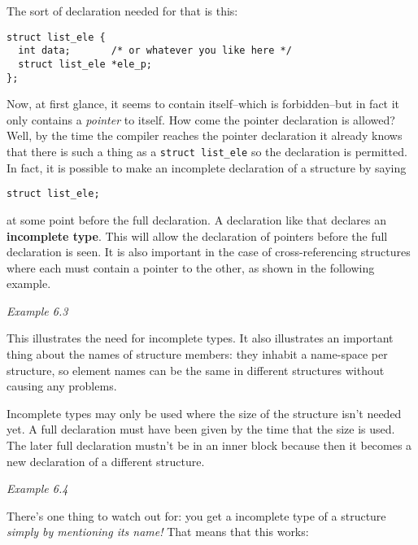    The sort of declaration needed for that is this:


   \begin{Verbatim}
struct list_ele {
  int data;       /* or whatever you like here */
  struct list_ele *ele_p;
};
\end{Verbatim}

   Now, at first glance, it seems to contain itself--which is
    forbidden--but in fact it only contains a \textit{pointer} to itself.
    How come the pointer declaration is allowed? Well, by the time the compiler
    reaches the pointer declaration it already knows that there is such a thing
    as a \texttt{struct list\_ele} so the declaration is permitted. In fact,
    it is possible to make an incomplete declaration of a structure by
    saying


   \begin{Verbatim}
struct list_ele;
\end{Verbatim}

   at some point before the full declaration. A declaration like that
    declares an \textbf{incomplete type}. This will allow the declaration of
    pointers before the full declaration is seen. It is also important in the
    case of cross-referencing structures where each must contain a pointer to
    the other, as shown in the following example.


    \begin{center}\textit{Example 6.3}\end{center}


   This illustrates the need for incomplete types. It also illustrates an
    important thing about the names of structure members: they inhabit
    a name-space per structure, so element names can be the same in different
    structures without causing any problems.


   Incomplete types may only be used where the size of the structure isn't
    needed yet. A full declaration must have been given by the time that the
    size is used. The later full declaration mustn't be in an inner block
    because then it becomes a new declaration of a different structure.


    \begin{center}\textit{Example 6.4}\end{center}


   There's one thing to watch out for: you get a incomplete type of
    a structure \textit{simply by mentioning its name!} That means that this
    works:


